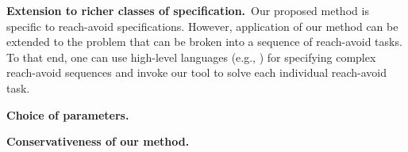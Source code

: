 {\smallskip
\noindent\textbf{Extension to richer classes of specification.}\
Our proposed method is specific to reach-avoid specifications. However, application of our method can be extended to the problem that can be broken into a sequence of reach-avoid tasks. To that end, one can use high-level languages (e.g., \cite{Majumdar2020,Ghosh2020}) for specifying complex reach-avoid sequences and invoke our tool to solve each individual reach-avoid task.

\smallskip
\noindent\textbf{Choice of parameters.}\

\smallskip
\noindent\textbf{Conservativeness of our method.}\
}

